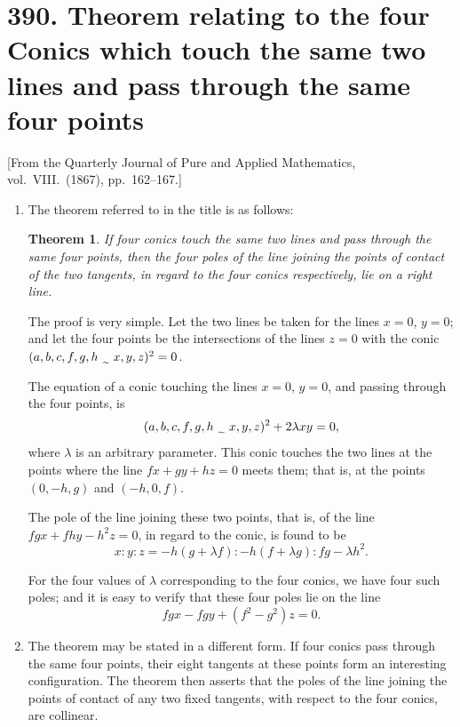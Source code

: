 \documentclass[12pt,a4paper]{article}
\theoremstyle{plain}
\newtheorem{theorem}{Theorem}
\theoremstyle{definition}
\theoremstyle{remark}
\begin{document}
\section*{390. Theorem relating to the four Conics which touch the same two lines and pass through the same four points}

\begin{center}
\small [From the Quarterly Journal of Pure and Applied Mathematics, vol.~VIII.\ (1867), pp.~162--167.]
\end{center}

\begin{enumerate}[label=\arabic*.]
\item The theorem referred to in the title is as follows:

\begin{theorem}
If four conics touch the same two lines and pass through the same four points, then the four poles of the line joining the points of contact of the two tangents, in regard to the four conics respectively, lie on a right line.
\end{theorem}

The proof is very simple. Let the two lines be taken for the lines $x = 0$, $y = 0$; and let the four points be the intersections of the lines $z = 0$ with the conic $(a,b,c,f,g,h \,\raisebox{-0.5ex}{\,\texttildelow\,}\, x,y,z)^2 = 0$.

The equation of a conic touching the lines $x = 0$, $y = 0$, and passing through the four points, is
\[(a,b,c,f,g,h \,\raisebox{-0.5ex}{\,\texttildelow\,}\, x,y,z)^2 + 2\lambda xy = 0,\]
where $\lambda$ is an arbitrary parameter. This conic touches the two lines at the points where the line $fx + gy + hz = 0$ meets them; that is, at the points $(0, -h, g)$ and $(-h, 0, f)$.

The pole of the line joining these two points, that is, of the line $fgx + fhy - h^2z = 0$, in regard to the conic, is found to be
\[x : y : z = -h(g + \lambda f) : -h(f + \lambda g) : fg - \lambda h^2.\]

For the four values of $\lambda$ corresponding to the four conics, we have four such poles; and it is easy to verify that these four poles lie on the line
\[fgx - fgy + (f^2 - g^2)z = 0.\]

\item The theorem may be stated in a different form. If four conics pass through the same four points, their eight tangents at these points form an interesting configuration. The theorem then asserts that the poles of the line joining the points of contact of any two fixed tangents, with respect to the four conics, are collinear.


\end{enumerate}
\end{document}
